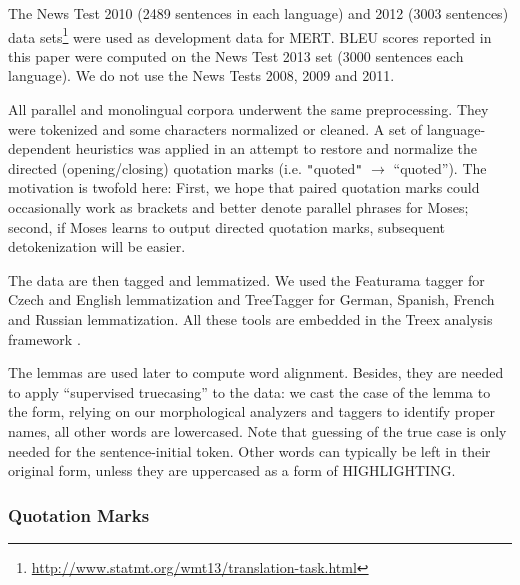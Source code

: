 \documentclass[11pt,letterpaper]{article}
\def\footurl#1{{\footnote{\url{#1}}}}
\def\equo#1{``#1''}  %
\def\code#1{{\tt{}#1}}
\def\parcite#1{\cite{#1}}  %
\def\parcite#1{\cite{#1}}
\begin{document}
The News Test 2010
(2489 sentences in each language) and 2012 (3003 sentences)
data sets\footurl{http://www.statmt.org/wmt13/translation-task.html} were used
as development data for MERT.
BLEU scores reported in this paper were computed on the News Test 2013 set
(3000 sentences each language).
We do not use the News Tests 2008, 2009 and 2011.

All parallel and monolingual corpora underwent the same preprocessing.
They were tokenized and some characters normalized or cleaned.
A set of language-dependent heuristics was applied in an attempt to restore and normalize
the directed (opening/closing) quotation marks (i.e. \code{"}quoted\code{"} $\rightarrow$ ``quoted'').
The motivation is twofold here:
First, we hope that paired quotation marks could occasionally work as brackets and better denote parallel phrases for Moses;
second, if Moses learns to output directed quotation marks, subsequent detokenization will be easier.

\begin{comment}
We use a slightly modified tokenization rules compared to CzEng export format.
Most notably, we normalize English abbreviated negation and auxiliary verbs
(\equo{couldn't} $\rightarrow$ \equo{could not}) and attempt at normalizing
quotation marks to distinguish between opening and closing one following proper
typesetting rules.
\end{comment}

The data are then tagged and lemmatized.
We used the Featurama tagger for Czech and English lemmatization and TreeTagger for German, Spanish, French and Russian lemmatization. All these tools are embedded in the Treex analysis framework \parcite{tectomt}.

The lemmas are used later to compute word alignment.
Besides, they are needed to apply  \equo{supervised truecasing} to the data:
we cast the case of the lemma to the form, relying on our morphological
analyzers and taggers to identify proper names, all other words are lowercased.
Note that guessing of the true case is only needed for the sentence-initial token.
Other words can typically be left in their original form, unless they are
uppercased as a form of HIGHLIGHTING.



\subsubsection{Quotation Marks}
\label{sec:quotes}
\end{document}
